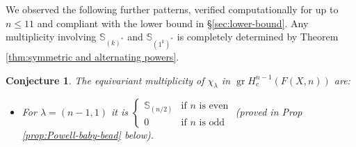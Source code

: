 \documentclass[12pt]{article}
\newcommand{\Specht}[1]{\chi_{#1}}
\newcommand{\TransposePartition}[1]{{#1}^{\ast}}
\newcommand{\Schur}[1]{\mathbb{S}_{#1}}
\DeclareMathOperator{\gr}{gr}
\theoremstyle{plain}
\newtheorem{conj}[thm]{Conjecture}
\theoremstyle{definition}
\theoremstyle{remark}
\begin{document}

We observed the following further patterns, verified computationally for up to $n\leq 11$ and compliant with the lower bound in \S\ref{sec:lower-bound}.
Any multiplicity involving $\Schur{\TransposePartition{(k)}}$ and $\Schur{\TransposePartition{(1^k)}}$ is completely determined by Theorem \ref{thm:symmetric and alternating powers}.

\begin{conj} \label{conj:patterns}
The equivariant multiplicity of $\Specht{\lambda}$ in $\gr H_c^{n-1}(F(X,n))$ are:
\begin{itemize}
    \item For $\lambda = (n-1, 1)$ it is $\begin{cases}
        \Schur{{(n/2)}} & \text{if } n \text{ is even} \\
        0 & \text{if } n \text{ is odd}
    \end{cases}$ (proved in Prop \ref{prop:Powell-baby-bead} below).
    

\end{itemize}
\end{conj}
\end{document}
